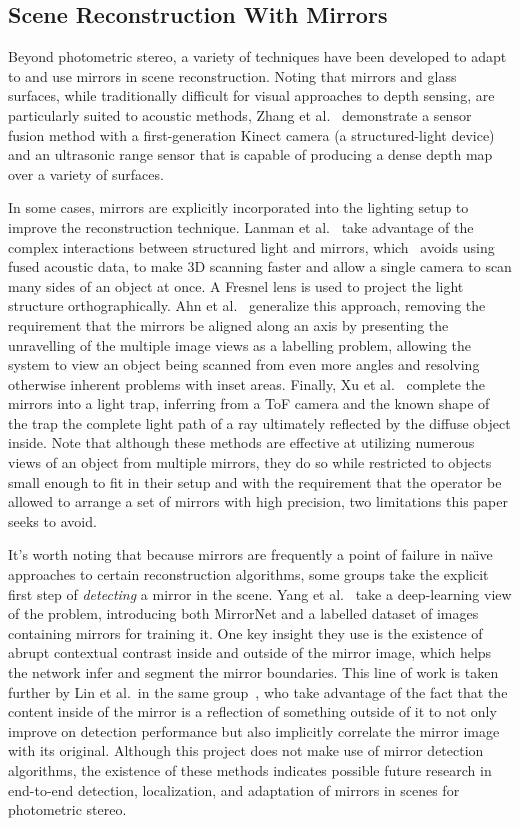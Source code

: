 \subsection{Scene Reconstruction With Mirrors}
Beyond photometric stereo, a variety of techniques have been developed to adapt
to and use mirrors in scene reconstruction. Noting that mirrors and glass
surfaces, while traditionally difficult for visual approaches to depth sensing,
are particularly suited to acoustic methods, Zhang et al.~\cite{zhang}
demonstrate a sensor fusion method with a first-generation Kinect camera (a
structured-light device) and an ultrasonic range sensor that is capable of
producing a dense depth map over a variety of surfaces.

In some cases, mirrors are explicitly incorporated into the lighting setup to
improve the reconstruction technique. Lanman et al.~\cite{lanman} take
advantage of the complex interactions between structured light and mirrors,
which~\cite{zhang} avoids using fused acoustic data, to make 3D scanning faster
and allow a single camera to scan many sides of an object at once. A Fresnel
lens is used to project the light structure orthographically. Ahn et
al.~\cite{ahn} generalize this approach, removing the requirement that the
mirrors be aligned along an axis by presenting the unravelling of the multiple
image views as a labelling problem, allowing the system to view an object being
scanned from even more angles and resolving otherwise inherent problems with
inset areas. Finally, Xu et al.~\cite{xu} complete the mirrors into a light
trap, inferring from a ToF camera and the known shape of the trap the complete
light path of a ray ultimately reflected by the diffuse object inside. Note
that although these methods are effective at utilizing numerous views of an
object from multiple mirrors, they do so while restricted to objects small
enough to fit in their setup and with the requirement that the operator be
allowed to arrange a set of mirrors with high precision, two limitations this
paper seeks to avoid.

It's worth noting that because mirrors are frequently a point of failure in
na\"{\i}ve approaches to certain reconstruction algorithms, some groups take
the explicit first step of \emph{detecting} a mirror in the scene. Yang et
al.~\cite{yang} take a deep-learning view of the problem, introducing both
MirrorNet and a labelled dataset of images containing mirrors for training it.
One key insight they use is the existence of abrupt contextual contrast inside
and outside of the mirror image, which helps the network infer and segment the
mirror boundaries. This line of work is taken further by Lin et al.\ in the
same group~\cite{lin}, who take advantage of the fact that the content inside
of the mirror is a reflection of something outside of it to not only improve on
detection performance but also implicitly correlate the mirror image with its
original.  Although this project does not make use of mirror detection
algorithms, the existence of these methods indicates possible future research
in end-to-end detection, localization, and adaptation of mirrors in scenes for
photometric stereo.

